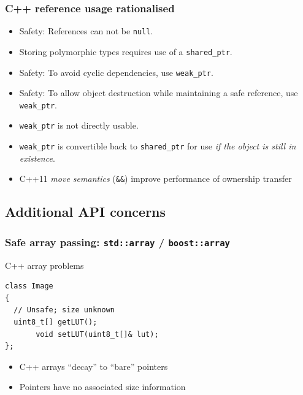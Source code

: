 \documentclass[handout]{beamer}
\begin{document}
\begin{frame}[fragile]
  \frametitle{C++ reference usage rationalised}
  \begin{itemize}
  \item<1-> Safety: References can not be \texttt{null}.
  \item<2-> Storing polymorphic types requires use of a
    \texttt{shared\_ptr}.
  \item<3-> Safety: To avoid cyclic dependencies, use \texttt{weak\_ptr}.
  \item<4-> Safety: To allow object destruction while maintaining a safe
    reference, use \texttt{weak\_ptr}.
  \item<5-> \texttt{weak\_ptr} is not directly usable.
  \item<5-> \texttt{weak\_ptr} is convertible back to \texttt{shared\_ptr}
    for use \emph{if the object is still in existence}.
  \item<6-> C++11 \emph{move semantics} (\texttt{\&\&}) improve
    performance of ownership transfer
  \end{itemize}
\end{frame}

\subsection{Additional API concerns}

\begin{frame}[fragile]
  \frametitle{Safe array passing: \texttt{std::array} / \texttt{boost::array}}
  \begin{block}{C++ array problems}
  \begin{lstlisting}
class Image
{
  // Unsafe; size unknown
  uint8_t[] getLUT();
       void setLUT(uint8_t[]& lut);
};
\end{lstlisting}
  \begin{itemize}
  \item C++ arrays “decay” to “bare” pointers
  \item Pointers have no associated size information
  \end{itemize}
  \end{block}
\end{frame}
\end{document}
